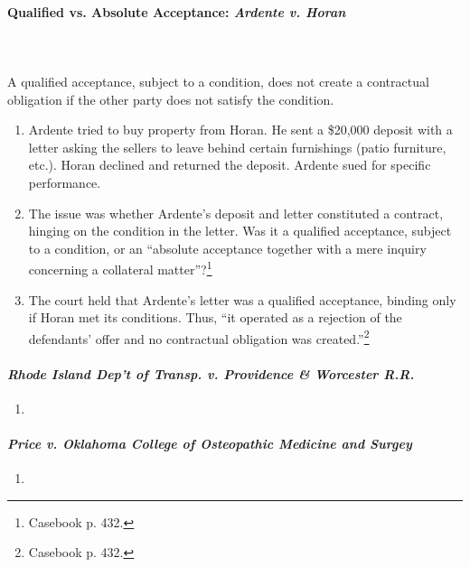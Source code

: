 \paragraph{Qualified vs. Absolute Acceptance: \emph{Ardente v. Horan}}
~\\\\
A qualified acceptance, subject to a condition, does not create a contractual 
obligation if the other party does not satisfy the condition.

\begin{enumerate}
    \item Ardente tried to buy property from Horan. He sent a \$20,000 deposit 
    with a letter asking the sellers to leave behind certain furnishings 
    (patio furniture, etc.). Horan declined and returned the deposit. Ardente 
    sued for specific performance.
    \item The issue was whether Ardente's deposit and letter constituted a 
    contract, hinging on the condition in the letter. Was it a qualified 
    acceptance, subject to a condition, or an ``absolute acceptance together 
    with a mere inquiry concerning a collateral matter''?\footnote{Casebook 
    p. 432.}
    \item The court held that Ardente's letter was a qualified acceptance, 
    binding only if Horan met its conditions. Thus, ``it operated as a 
    rejection of the defendants' offer and no contractual obligation was 
    created.''\footnote{Casebook p. 432.}
\end{enumerate}

\paragraph{\emph{Rhode Island Dep't of Transp. v. Providence \& Worcester 
R.R.}}

\begin{enumerate}
    \item %
\end{enumerate}

\paragraph{\emph{Price v. Oklahoma College of Osteopathic Medicine and Surgey}}

\begin{enumerate}
    \item %
\end{enumerate}

